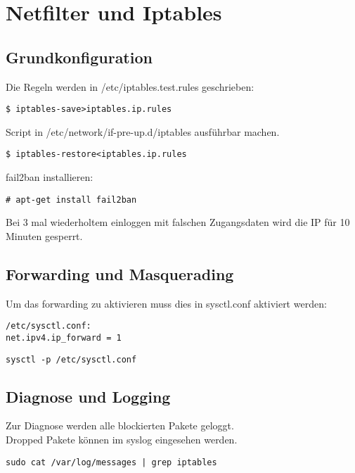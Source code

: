 \chapter{Netfilter und Iptables}
\section{Grundkonfiguration}
Die Regeln werden in /etc/iptables.test.rules geschrieben:

\begin{lstlisting}[style=Bash]
$ iptables-save>iptables.ip.rules
\end{lstlisting}
Script in /etc/network/if-pre-up.d/iptables ausführbar machen.\\
\begin{lstlisting}[style=Bash]
$ iptables-restore<iptables.ip.rules
\end{lstlisting}
fail2ban installieren:
\begin{lstlisting}[style=Bash]
# apt-get install fail2ban
\end{lstlisting}
Bei 3 mal wiederholtem einloggen mit falschen Zugangsdaten wird die IP für 10 Minuten gesperrt.
\section{Forwarding und Masquerading}
Um das forwarding zu aktivieren muss dies in sysctl.conf aktiviert werden:
\begin{lstlisting}[style=Bash]
/etc/sysctl.conf:
net.ipv4.ip_forward = 1
\end{lstlisting}
\begin{lstlisting}[style=Bash]
sysctl -p /etc/sysctl.conf
\end{lstlisting}
\section{Diagnose und Logging}
Zur Diagnose werden alle blockierten Pakete geloggt.\\
Dropped Pakete können im syslog eingesehen werden.
\begin{lstlisting}[style=Bash]
sudo cat /var/log/messages | grep iptables
\end{lstlisting}
